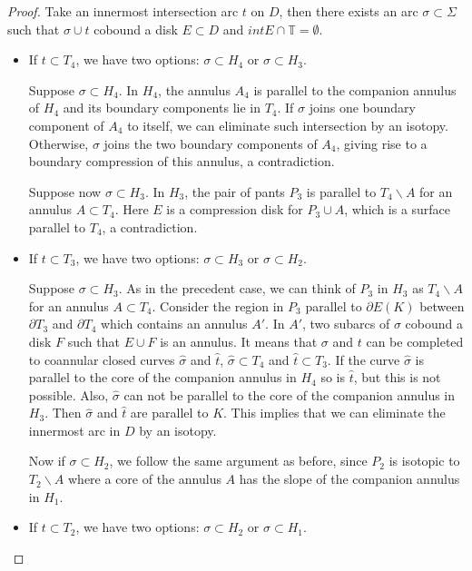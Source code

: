 \documentclass[12pt]{amsart}
\begin{document}
\begin{proof}
Take an innermost intersection arc $t$ on $D$, then there exists an arc $\sigma\subset\Sigma$ such that $\sigma\cup t$ cobound a disk $E\subset D$ and ${int}E\cap \mathbb{T}=\emptyset$. 


\begin{itemize}

    \item If $t\subset T_4$, we have two options: $\sigma\subset H_4$ or $\sigma\subset H_3$.
    
Suppose $\sigma\subset H_4$. In $H_4$, the annulus $A_4$ is parallel to the companion annulus of $H_4$ and its boundary components lie in $T_4$. If $\sigma$ joins one boundary component of $A_4$ to itself, we can eliminate such intersection by an isotopy. Otherwise, $\sigma$ joins the two boundary components of $A_4$, giving rise to a boundary compression of this annulus, a contradiction.

Suppose now $\sigma\subset H_3$. In $H_3$, the pair of pants $P_3$ is parallel to $T_4\backslash A$ for an annulus $A\subset T_4$. Here $E$ is a compression disk for $P_3 \cup A$, which is a surface parallel to $T_4$, a contradiction.  


    \item If $t\subset T_3$, we have two options: $\sigma\subset H_3$ or $\sigma\subset H_2$.

Suppose $\sigma\subset H_3$. As in the precedent case, we can think of $P_3$ in $H_3$ as $T_4\backslash A$ for an annulus $A\subset T_4$. Consider the region in $P_3$ parallel to $\partial E(K)$ between $\partial T_3$ and $\partial T_4$ which contains an annulus $A'$. In $A'$, two subarcs of $\sigma$ cobound a disk $F$ such that $E\cup F$ is an annulus. It means that $\sigma$ and $t$ can be completed to coannular closed curves $\hat{\sigma}$ and $\hat{t}$,  $\hat{\sigma}\subset T_4$ and $\hat{t}\subset T_3$. If the curve $\hat{\sigma}$ is parallel to the core of the companion annulus in $H_4$ so is $\hat{t}$, but this is not possible. Also, $\hat \sigma$ can not be parallel to the core of the companion annulus in $H_3$. Then  $\hat{\sigma}$ and $\hat{t}$ are parallel to $K$. This implies that we can eliminate the innermost arc in $D$ by an isotopy. 

Now if $\sigma\subset H_2$, we follow the same argument as  before, since $P_2$ is isotopic to $T_2\backslash A$ where a core of the annulus $A$ has the slope of the companion annulus in $H_1$.

    \item If $t\subset T_2$, we have two options: $\sigma\subset H_2$ or $\sigma\subset H_1$. 


\end{itemize}
\end{proof}
\end{document}
